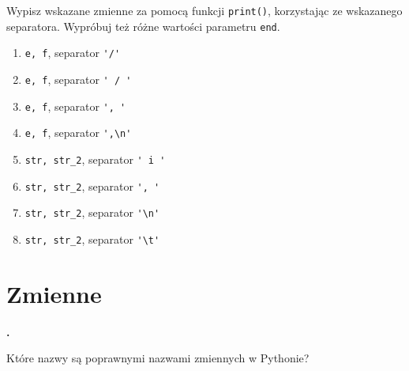 \documentclass[a4paper]{article}
\begin{document}
Wypisz wskazane zmienne za pomocą funkcji \verb|print()|, korzystając ze wskazanego separatora. Wypróbuj też różne wartości parametru \verb|end|.
\begin{multicols}{2}
\begin{enumerate}[label=\arabic*.]
    \item \verb|e, f|, separator \verb|'/'|
    \item \verb|e, f|, separator \verb|' / '|
    \item \verb|e, f|, separator \verb|', '|
    \item \verb|e, f|, separator \verb|',\n'|
    \item \verb|str, str_2|, separator \verb|' i '|
    \item \verb|str, str_2|, separator \verb|', '|
    \item \verb|str, str_2|, separator \verb|'\n'|
    \item \verb|str, str_2|, separator \verb|'\t'|
\end{enumerate}
\end{multicols}


\section{Zmienne}
\textbf{.}\addtocounter{zadanie}{1} Które nazwy są poprawnymi nazwami zmiennych w Pythonie?
\end{document}
